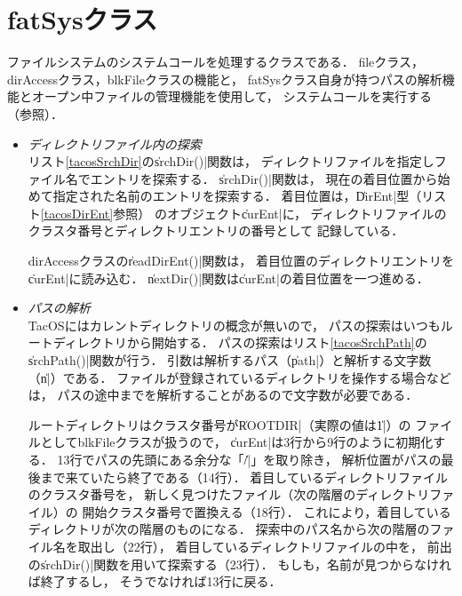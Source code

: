 \section{fatSysクラス}
ファイルシステムのシステムコールを処理するクラスである．
fileクラス，dirAccessクラス，blkFileクラスの機能と，
fatSysクラス自身が持つパスの解析機能とオープン中ファイルの管理機能を使用して，
システムコールを実行する（参照）．

\begin{itemize}
\item \emph{ディレクトリファイル内の探索} \\
  リスト\ref{tacosSrchDir}の\|srchDir()|関数は，
  ディレクトリファイルを指定しファイル名でエントリを探索する．
  \|srchDir()|関数は，
  現在の着目位置から始めて指定された名前のエントリを探索する．
  着目位置は，\|DirEnt|型（リスト\ref{tacosDirEnt}参照）
  のオブジェクト\|curEnt|に，
  ディレクトリファイルのクラスタ番号とディレクトリエントリの番号として
  記録している．

  

  dirAccessクラスの\|readDirEnt()|関数は，
  着目位置のディレクトリエントリを\|curEnt|に読み込む．
  \|nextDir()|関数は\|curEnt|の着目位置を一つ進める．

\item \emph{パスの解析} \\
  TacOSにはカレントディレクトリの概念が無いので，
  パスの探索はいつもルートディレクトリから開始する．
  パスの探索はリスト\ref{tacosSrchPath}の\|srchPath()|関数が行う．
  引数は解析するパス（\|path|）と解析する文字数（\|n|）である．
  ファイルが登録されているディレクトリを操作する場合などは，
  パスの途中までを解析することがあるので文字数が必要である．
  
  

  ルートディレクトリはクラスタ番号が\|ROOTDIR|（実際の値は\|1|）の
  ファイルとしてblkFileクラスが扱うので，
  \|curEnt|は3行から9行のように初期化する．
  13行でパスの先頭にある余分な「\|/|」を取り除き，
  解析位置がパスの最後まで来ていたら終了である（14行）．
  着目しているディレクトリファイルのクラスタ番号を，
  新しく見つけたファイル（次の階層のディレクトリファイル）の
  開始クラスタ番号で置換える（18行）．
  これにより，着目しているディレクトリが次の階層のものになる．
  探索中のパス名から次の階層のファイル名を取出し（22行），
  着目しているディレクトリファイルの中を，
  前出の\|srchDir()|関数を用いて探索する（23行）．
  もしも，名前が見つからなければ終了するし，
  そうでなければ13行に戻る．


\end{itemize}

